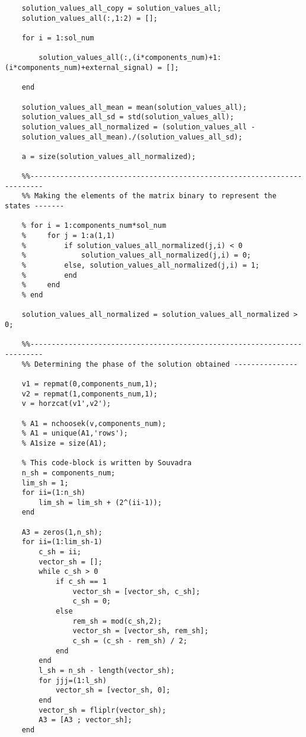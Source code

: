\documentclass{article}
\begin{document}
\begin{verbatim}
    solution_values_all_copy = solution_values_all;
    solution_values_all(:,1:2) = [];
    
    for i = 1:sol_num
    
        solution_values_all(:,(i*components_num)+1:(i*components_num)+external_signal) = [];
    
    end
    
    solution_values_all_mean = mean(solution_values_all);
    solution_values_all_sd = std(solution_values_all);
    solution_values_all_normalized = (solution_values_all - 
    solution_values_all_mean)./(solution_values_all_sd);
    
    a = size(solution_values_all_normalized);
    
    %%-------------------------------------------------------------------------
    %% Making the elements of the matrix binary to represent the states -------
    
    % for i = 1:components_num*sol_num
    %     for j = 1:a(1,1)
    %         if solution_values_all_normalized(j,i) < 0
    %             solution_values_all_normalized(j,i) = 0;
    %         else, solution_values_all_normalized(j,i) = 1;
    %         end
    %     end
    % end
    
    solution_values_all_normalized = solution_values_all_normalized > 0;
    
    %%-------------------------------------------------------------------------
    %% Determining the phase of the solution obtained ---------------
    
    v1 = repmat(0,components_num,1);
    v2 = repmat(1,components_num,1);
    v = horzcat(v1',v2');
    
    % A1 = nchoosek(v,components_num);
    % A1 = unique(A1,'rows');
    % A1size = size(A1);
    
    % This code-block is written by Souvadra
    n_sh = components_num;
    lim_sh = 1;
    for ii=(1:n_sh)
        lim_sh = lim_sh + (2^(ii-1));
    end    
    
    A3 = zeros(1,n_sh);
    for ii=(1:lim_sh-1)
        c_sh = ii;
        vector_sh = [];
        while c_sh > 0
            if c_sh == 1
                vector_sh = [vector_sh, c_sh];
                c_sh = 0;
            else
                rem_sh = mod(c_sh,2);
                vector_sh = [vector_sh, rem_sh];
                c_sh = (c_sh - rem_sh) / 2;
            end
        end
        l_sh = n_sh - length(vector_sh);
        for jjj=(1:l_sh)
            vector_sh = [vector_sh, 0];
        end
        vector_sh = fliplr(vector_sh);
        A3 = [A3 ; vector_sh];
    end
    

\end{verbatim}
\end{document}
